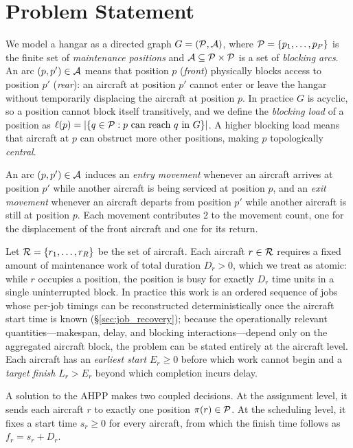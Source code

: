 \section{Problem Statement}
\label{sec:problem}

We model a hangar as a directed graph $G = (\mathcal{P}, \mathcal{A})$, where
$\mathcal{P} = \{p_1, \dots, p_P\}$ is the finite set of \emph{maintenance positions}
and $\mathcal{A} \subseteq \mathcal{P} \times \mathcal{P}$ is a set of \emph{blocking arcs}.  An
arc $(p, p') \in \mathcal{A}$ means that position $p$ (\emph{front}) physically
blocks access to position $p'$ (\emph{rear}): an aircraft at position $p'$
cannot enter or leave the hangar without temporarily displacing the aircraft
at position $p$.  In practice $G$ is acyclic, so a position cannot block
itself transitively, and we define the \emph{blocking load} of a position as
$\ell(p) = |\{q \in \mathcal{P} : p \text{ can reach } q \text{ in } G\}|$.  A
higher blocking load means that aircraft at $p$ can obstruct more other
positions, making $p$ topologically \emph{central}.

An arc $(p, p') \in \mathcal{A}$ induces an \emph{entry movement} whenever an
aircraft arrives at position $p'$ while another aircraft is being serviced
at position $p$, and an \emph{exit movement} whenever an aircraft departs
from position $p'$ while another aircraft is still at position $p$.  Each
movement contributes 2 to the movement count, one for the displacement of
the front aircraft and one for its return.

Let $\mathcal{R} = \{r_1, \dots, r_R\}$ be the set of aircraft.  Each aircraft
$r \in \mathcal{R}$ requires a fixed amount of maintenance work of total
duration $D_r > 0$, which we treat as atomic: while $r$ occupies a
position, the position is busy for exactly $D_r$ time units in a single
uninterrupted block.  In practice this work is an ordered sequence of jobs
whose per-job timings can be reconstructed deterministically once the
aircraft start time is known (\S\ref{sec:job_recovery}); because the
operationally relevant quantities---makespan, delay, and blocking
interactions---depend only on the aggregated aircraft block, the problem
can be stated entirely at the aircraft level.
Each aircraft has an \emph{earliest start} $E_r \ge 0$ before which work
cannot begin and a \emph{target finish} $L_r > E_r$ beyond which
completion incurs delay.

A solution to the AHPP makes two coupled decisions.  At the assignment
level, it sends each aircraft $r$ to exactly one position
$\pi(r) \in \mathcal{P}$.  At the scheduling level, it fixes a start time
$s_r \ge 0$ for every aircraft, from which the finish time follows as
$f_r = s_r + D_r$.

